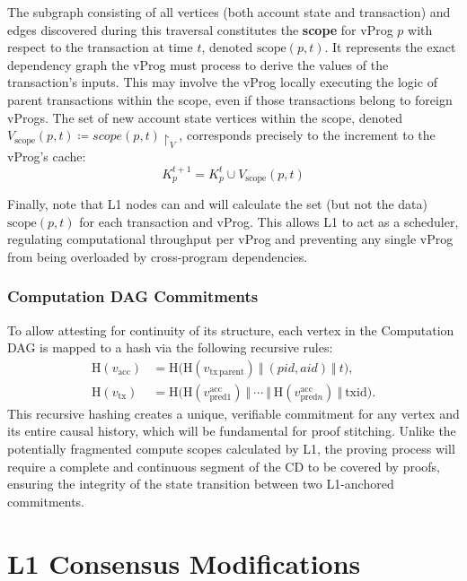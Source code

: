 \documentclass[onecolumn, 9pt, a4paper]{extarticle}
\begin{document}
The subgraph consisting of all vertices (both account state and transaction) and edges discovered during this traversal constitutes the \textbf{scope} for vProg $p$ with respect to the transaction at time $t$, denoted $\mathrm{scope}(p,t)$. It represents the exact dependency graph the vProg must process to derive the values of the transaction's inputs. This may involve the vProg locally executing the logic of parent transactions within the scope, even if those transactions belong to foreign vProgs. The set of new account state vertices within the scope, denoted $V_{\text{scope}}(p,t)\coloneqq scope(p,t)\!\restriction_V$, corresponds precisely to the increment to the vProg's cache:
\[ K^{t+1}_p= K^t_p\cup V_{\text{scope}}(p,t)
\]

Finally, note that L1 nodes can and will calculate the set (but not the data) $\mathrm{scope}(p,t)$ for each transaction and vProg. This allows L1 to act as a scheduler, regulating computational throughput per vProg and preventing any single vProg from being overloaded by cross-program dependencies.

\subsubsection{Computation DAG Commitments}\label{sec:cd-commitments}
To allow attesting for continuity of its structure, each vertex in the Computation DAG is mapped to a hash via
the following recursive rules:
\begin{align*}
\mathrm{H}(v_{\mathrm{acc}})&=\mathrm{H}\big(\mathrm{H}(v_{\mathrm{tx}\, \text{parent}})\ \Vert\ (pid,aid)\ \Vert\ t\big),\\
\mathrm{H}(v_{\mathrm{tx}})&=\mathrm{H}\big(\mathrm{H}(v^{\mathrm{acc}}_{\mathrm{pred} 1})\ \Vert\ \cdots\ \Vert\ \mathrm{H}(v^{\mathrm{acc}}_{\mathrm{pred} n})\ \Vert\ \mathrm{txid}\big).
\end{align*}
This recursive hashing creates a unique, verifiable commitment for any vertex and its entire causal history,
which will be fundamental for proof stitching. Unlike the potentially fragmented compute scopes calculated by
L1, the proving process will require a complete and continuous segment of the CD to be covered by proofs,
ensuring the integrity of the state transition between two L1-anchored commitments. 

\section{L1 Consensus Modifications}
\end{document}
